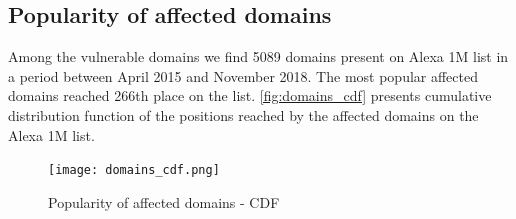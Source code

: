 \subsection{Popularity of affected domains}

Among the vulnerable domains we find 5089 domains present on Alexa 1M list in a period between April 2015 and November 2018. The most popular affected domains reached 266th place on the list. \autoref{fig:domains_cdf} presents cumulative distribution function of the positions reached  by the affected domains on the Alexa 1M list. 


\begin{figure}[!hbt]
\centering
\texttt{[image: domains\_cdf.png]}
\caption{Popularity of affected domains - CDF}
\label{fig:domains_cdf}
\end{figure}
